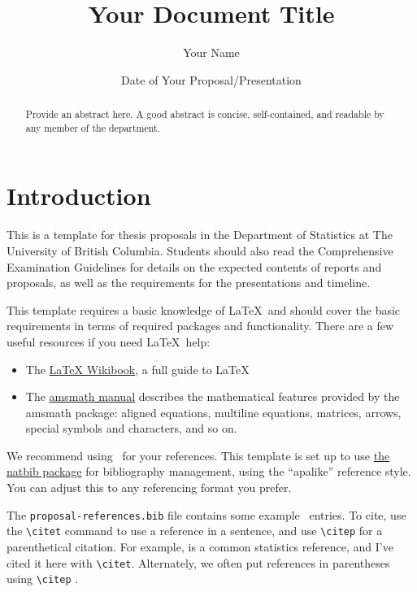 \documentclass[draft]{ubcstatproposal} %
\title{Your Document Title}
\author{Your Name}
\date{Date of Your Proposal/Presentation}
\theoremstyle{plain}
\begin{document}
\maketitle


\begin{abstract}
  Provide an abstract here. A good abstract is concise, self-contained, and
  readable by any member of the department.
\end{abstract}

\section{Introduction}

This is a template for thesis proposals in the Department of Statistics at The
University of British Columbia. Students should also read the Comprehensive
Examination Guidelines for details on the expected contents of reports and
proposals, as well as the requirements for the presentations and timeline.

This template requires a basic knowledge of \LaTeX\ and should cover the basic
requirements in terms of required packages and functionality. There are a few
useful resources if you need \LaTeX\ help:
\begin{itemize}
\item The \href{https://en.wikibooks.org/wiki/LaTeX}{LaTeX Wikibook}, a full
  guide to \LaTeX
\item The
  \href{http://mirrors.ctan.org/macros/latex/required/amsmath/amsldoc.pdf}{amsmath
    manual} describes the mathematical features provided by the amsmath package:
  aligned equations, multiline equations, matrices, arrows, special symbols and
  characters, and so on.
\end{itemize}

We recommend using \BibTeX\ for your references. This template is set up to use
\href{http://mirrors.ctan.org/macros/latex/contrib/natbib/natbib.pdf}{the natbib
  package} for bibliography management, using the ``apalike'' reference style.
You can adjust this to any referencing format you prefer.

The \texttt{proposal-references.bib} file contains some example \BibTeX\ entries.
To cite, use the \verb|\citet| command to use a reference in a sentence, and use
\verb|\citep| for a parenthetical citation. For example, \citet{Wasserman:2004}
is a common statistics reference, and I've cited it here with \verb|\citet|.
Alternately, we often put references in parentheses using \verb|\citep|
\citep{Underhill:1999}.
\end{document}
